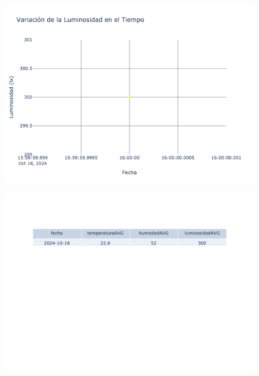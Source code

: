 \documentclass{article}
\begin{document}
    \noindent
    \begin{minipage}{0.48\textwidth}
        \centering
        \includegraphics[width=\textwidth]{../img/poli/LS701-90Dias-03-12-2024.png}
    \end{minipage}
    \hfill
    \begin{minipage}{0.48\textwidth}
        \centering
        \includegraphics[width=\textwidth]{../img/tables/CAVG701-90Dias-03-12-2024.png}
    \end{minipage}
    
\end{document}

